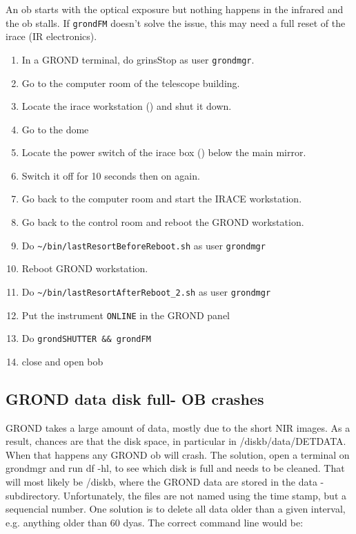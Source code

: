 \documentclass[11pt,fleqn,a4paper]{book}
\def\home{\textasciitilde{}}
\begin{document}
An \gls{ob} starts with the optical exposure but nothing happens in the infrared and
the \gls{ob} \gls{stall}s. If \texttt{grondFM} doesn't solve the issue, this may need a full reset of the \gls{irace} (IR electronics).
 
\label{proc:iracerestart}
\begin{enumerate}
  \item In a GROND terminal, do \gls{grinsStop} as user \texttt{grondmgr}.
  \item Go to the \gls{computer room} of the telescope building.
  \item Locate the \gls{irace} workstation () and shut it down.
  \item Go to the \gls{dome} 
  \item Locate the power switch of the \gls{irace} box () below the \gls{main mirror}.
  \item Switch it off for 10 seconds then on again.
  \item Go back to the \gls{computer room} and start the IRACE workstation.
  \item Go back to the \gls{control room} and reboot the GROND workstation.
  \item Do \texttt{\home/bin/lastResortBeforeReboot.sh} as user \texttt{grondmgr}
  \item Reboot GROND workstation.
  \item Do \texttt{\home/bin/lastResortAfterReboot\_2.sh} as user \texttt{grondmgr}
  \item Put the instrument \texttt{ONLINE} in the GROND panel
  \item Do \texttt{grondSHUTTER \&\& grondFM}
  \item close and open bob
\end{enumerate} 



\subsection{GROND data disk full- OB crashes}

GROND takes a large amount of data, mostly due to the short NIR images. As a result, chances are that the disk space, in particular in /diskb/data/DETDATA. When that happens any GROND \gls{ob} will crash. The solution, open a terminal on grondmgr and run df -hl, to see which disk is full and needs to be cleaned.  That will most likely be /diskb, where the GROND data are stored in the data -subdirectory. Unfortunately, the files are not named using the time stamp, but a sequencial number. One solution is to delete all data older than  a given interval, e.g. anything older than 60 dyas. The correct command line would be: 
\end{document}
